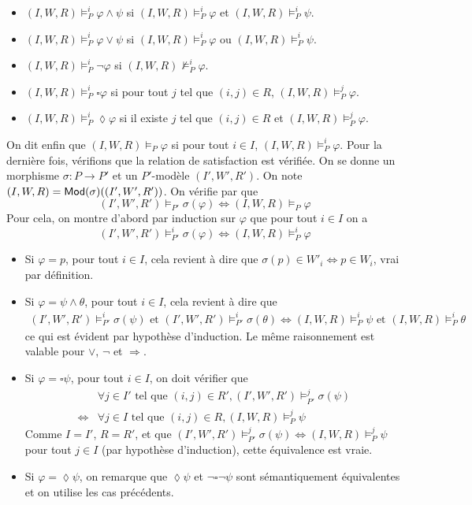 \documentclass[11pt,a4paper]{article}
\newcommand{\ph}{\varphi}
\renewcommand{\iff}{\Leftrightarrow}
\newcommand{\info}[1]{\text{{\fontfamily{lmss}\selectfont #1}}}
\newcommand{\Mod}{\info{Mod}}
\begin{document}
\begin{itemize}
\begin{itemize}
\item $(I,W,R) \models^i_P \ph \wedge \psi$ si $(I,W,R) \models^i_P \ph$ et $(I,W,R) \models^i_P \psi$.
\item $(I,W,R) \models^i_P \ph \vee \psi$ si $(I,W,R) \models^i_P \ph$ ou $(I,W,R) \models^i_P \psi$.
\item $(I,W,R) \models^i_P \neg \ph$ si $(I,W,R) \not\models^i_P \ph$.
\item $(I,W,R) \models^i_P \square \ph$ si pour tout $j$ tel que $(i,j) \in R$, $(I,W,R) \models^j_P \ph$.
\item $(I,W,R) \models^i_P \lozenge \ph$ si il existe $j$ tel que $(i,j) \in R$ et $(I,W,R) \models^j_P \ph$.
\end{itemize}
On dit enfin que $(I,W,R) \models_P \ph$ si pour tout $i \in I$, $(I,W,R) \models^i_P \ph$. Pour la dernière fois, vérifions que la relation de satisfaction est vérifiée. On se donne un morphisme $\sigma : P \to P'$ et un $P'$-modèle $(I',W',R')$. On note $(I,W,R) = \Mod(\sigma)((I',W',R'))$. On vérifie par que 
\[ (I',W',R') \models_{P'} \sigma(\ph) \iff (I,W,R) \models_P \ph \]
Pour cela, on montre d'abord par induction sur $\ph$ que pour tout $i \in I$ on a 
\[ (I',W',R') \models^i_{P'} \sigma(\ph) \iff (I,W,R) \models^i_P \ph \]
\begin{itemize}
\setlength\itemsep{-0.3em}
\item Si $\ph = p$, pour tout $i \in I$, cela revient à dire que $\sigma(p) \in W'_i \iff p \in W_i$, vrai par définition.
\item Si $\ph = \psi \wedge \theta$, pour tout $i \in I$, cela revient à dire que 
\begin{align*} (I',W',R') \models^i_{P'} \sigma(\psi) \text{ et } (I',W',R') \models^i_{P'} \sigma(\theta) \iff (I,W,R) \models^i_P \psi \text{ et } (I,W,R) \models^i_P \theta
\end{align*}
ce qui est évident par hypothèse d'induction. Le même raisonnement est valable pour $\vee$, $\neg$ et $\Rightarrow$.
\item Si $\ph = \square \psi$, pour tout $i \in I$, on doit vérifier que
\begin{align*} & \forall j \in I' \text{ tel que } (i,j) \in R', (I',W',R') \models^j_{P'} \sigma(\psi) \\ \iff & \forall j \in I \text{ tel que } (i,j) \in R, (I,W,R) \models^j_P \psi
\end{align*}
Comme $I = I'$, $R = R'$, et que $(I',W',R') \models^j_{P'} \sigma(\psi) \iff (I,W,R) \models^j_{P} \psi$ pour tout $j \in I$ (par hypothèse d'induction), cette équivalence est vraie.
\item Si $\ph = \lozenge \psi$, on remarque que $\lozenge \psi$ et $\neg \square \neg \psi$ sont sémantiquement équivalentes et on utilise les cas précédents.
\end{itemize}
\end{itemize}
\end{document}

